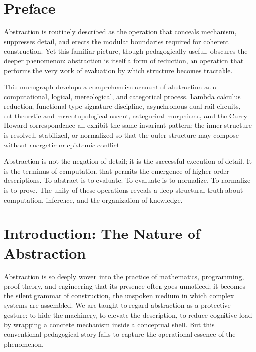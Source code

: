 \documentclass[12pt,letterpaper]{article}
\begin{document}
\newpage

\tableofcontents
\newpage

\section{Preface}

Abstraction is routinely described as the operation that conceals mechanism, suppresses detail, and erects the modular boundaries required for coherent construction. Yet this familiar picture, though pedagogically useful, obscures the deeper phenomenon: abstraction is itself a form of reduction, an operation that performs the very work of evaluation by which structure becomes tractable.

This monograph develops a comprehensive account of abstraction as a computational, logical, mereological, and categorical process. Lambda calculus reduction, functional type-signature discipline, asynchronous dual-rail circuits, set-theoretic and mereotopological ascent, categorical morphisms, and the Curry--Howard correspondence all exhibit the same invariant pattern: the inner structure is resolved, stabilized, or normalized so that the outer structure may compose without energetic or epistemic conflict. 

Abstraction is not the negation of detail; it is the successful execution of detail. It is the terminus of computation that permits the emergence of higher-order descriptions. To abstract is to evaluate. To evaluate is to normalize. To normalize is to prove. The unity of these operations reveals a deep structural truth about computation, inference, and the organization of knowledge.

\section{Introduction: The Nature of Abstraction}

Abstraction is so deeply woven into the practice of mathematics, programming, proof theory, and engineering that its presence often goes unnoticed; it becomes the silent grammar of construction, the unspoken medium in which complex systems are assembled. We are taught to regard abstraction as a protective gesture: to hide the machinery, to elevate the description, to reduce cognitive load by wrapping a concrete mechanism inside a conceptual shell. But this conventional pedagogical story fails to capture the operational essence of the phenomenon.
\end{document}
